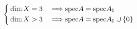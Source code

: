 \begin{equation*}
\left\{\begin{aligned}
& \dim X = 3 & \implies & \mathrm{spec} A = \mathrm{spec} A_0 \\
& \dim X > 3 & \implies & \mathrm{spec} A = \mathrm{spec} A_0 \cup \{0\}
\end{aligned}\right.\end{equation*}
